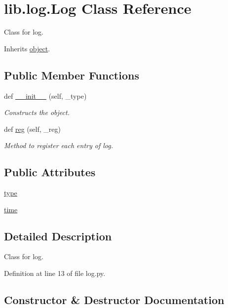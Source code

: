 \hypertarget{classlib_1_1log_1_1_log}{}\section{lib.\+log.\+Log Class Reference}
\label{classlib_1_1log_1_1_log}


Class for log.  




Inherits \hyperlink{classobject}{object}.

\subsection*{Public Member Functions}
\begin{DoxyCompactItemize}
\item 
def \hyperlink{classlib_1_1log_1_1_log_a63ed5aae48af96a4c7900abe4e813531}{\+\_\+\+\_\+init\+\_\+\+\_\+} (self, \+\_\+type)
\begin{DoxyCompactList}\small\item\em Constructs the object. \end{DoxyCompactList}\item 
def \hyperlink{classlib_1_1log_1_1_log_a56417d3cb97d036e5759712e5792e320}{reg} (self, \+\_\+reg)
\begin{DoxyCompactList}\small\item\em Method to register each entry of log. \end{DoxyCompactList}\end{DoxyCompactItemize}
\subsection*{Public Attributes}
\begin{DoxyCompactItemize}
\item 
\hyperlink{classlib_1_1log_1_1_log_ac2d76302c8228adea2a1824993ff8d51}{type}
\item 
\hyperlink{classlib_1_1log_1_1_log_a1c5cec444134f711805cdd18ccb5c966}{time}
\end{DoxyCompactItemize}


\subsection{Detailed Description}
Class for log. 

Definition at line 13 of file log.\+py.



\subsection{Constructor \& Destructor Documentation}
